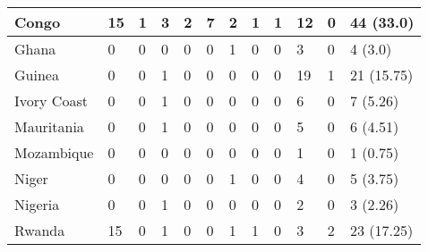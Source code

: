 \begin{sidewaystable}[htp]
{\begin{tabular}{|l|llllllllll|l|}
    Congo & \multicolumn{1}{l|}{15} & \multicolumn{1}{l|}{1} & \multicolumn{1}{l|}{3} & \multicolumn{1}{l|}{2} & \multicolumn{1}{l|}{7} & \multicolumn{1}{l|}{2} & \multicolumn{1}{l|}{1} & \multicolumn{1}{l|}{1} & \multicolumn{1}{l|}{12} & 0 & 44  (33.0) \\ \hline
    Ghana & \multicolumn{1}{l|}{0} & \multicolumn{1}{l|}{0} & \multicolumn{1}{l|}{0} & \multicolumn{1}{l|}{0} & \multicolumn{1}{l|}{0} & \multicolumn{1}{l|}{1} & \multicolumn{1}{l|}{0} & \multicolumn{1}{l|}{0} & \multicolumn{1}{l|}{3} & 0 & 4	(3.0) \\ \hline
    Guinea & \multicolumn{1}{l|}{0} & \multicolumn{1}{l|}{0} & \multicolumn{1}{l|}{1} & \multicolumn{1}{l|}{0} & \multicolumn{1}{l|}{0} & \multicolumn{1}{l|}{0} & \multicolumn{1}{l|}{0} & \multicolumn{1}{l|}{0} & \multicolumn{1}{l|}{19} & 1 & 21  (15.75) \\ \hline
    Ivory Coast & \multicolumn{1}{l|}{0} & \multicolumn{1}{l|}{0} & \multicolumn{1}{l|}{1} & \multicolumn{1}{l|}{0} & \multicolumn{1}{l|}{0} & \multicolumn{1}{l|}{0} & \multicolumn{1}{l|}{0} & \multicolumn{1}{l|}{0} & \multicolumn{1}{l|}{6} & 0 & 7	(5.26) \\ \hline
    Mauritania & \multicolumn{1}{l|}{0} & \multicolumn{1}{l|}{0} & \multicolumn{1}{l|}{1} & \multicolumn{1}{l|}{0} & \multicolumn{1}{l|}{0} & \multicolumn{1}{l|}{0} & \multicolumn{1}{l|}{0} & \multicolumn{1}{l|}{0} & \multicolumn{1}{l|}{5} & 0 & 6	(4.51) \\ \hline
    Mozambique & \multicolumn{1}{l|}{0} & \multicolumn{1}{l|}{0} & \multicolumn{1}{l|}{0} & \multicolumn{1}{l|}{0} & \multicolumn{1}{l|}{0} & \multicolumn{1}{l|}{0} & \multicolumn{1}{l|}{0} & \multicolumn{1}{l|}{0} & \multicolumn{1}{l|}{1} & 0 & 1	(0.75) \\ \hline
    Niger & \multicolumn{1}{l|}{0} & \multicolumn{1}{l|}{0} & \multicolumn{1}{l|}{0} & \multicolumn{1}{l|}{0} & \multicolumn{1}{l|}{0} & \multicolumn{1}{l|}{1} & \multicolumn{1}{l|}{0} & \multicolumn{1}{l|}{0} & \multicolumn{1}{l|}{4} & 0 & 5	(3.75) \\ \hline
    Nigeria & \multicolumn{1}{l|}{0} & \multicolumn{1}{l|}{0} & \multicolumn{1}{l|}{1} & \multicolumn{1}{l|}{0} & \multicolumn{1}{l|}{0} & \multicolumn{1}{l|}{0} & \multicolumn{1}{l|}{0} & \multicolumn{1}{l|}{0} & \multicolumn{1}{l|}{2} & 0 & 3	(2.26) \\ \hline
    Rwanda & \multicolumn{1}{l|}{15} & \multicolumn{1}{l|}{0} & \multicolumn{1}{l|}{1} & \multicolumn{1}{l|}{0} & \multicolumn{1}{l|}{0} & \multicolumn{1}{l|}{1} & \multicolumn{1}{l|}{1} & \multicolumn{1}{l|}{0} & \multicolumn{1}{l|}{3} & 2 & 23  (17.25) \\ \hline

\end{tabular}}
\end{sidewaystable}
